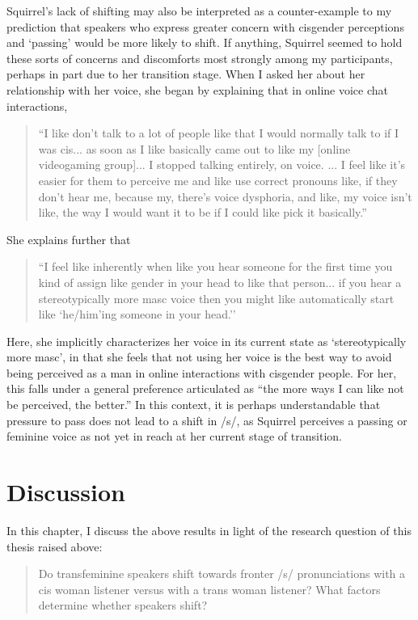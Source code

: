 \documentclass[12pt,twoside]{reedthesis}
\begin{document}
Squirrel's lack of shifting may also be interpreted as a counter-example to my prediction that speakers who express greater concern with cisgender perceptions and `passing' would be more likely to shift. If anything, Squirrel seemed to hold these sorts of concerns and discomforts most strongly among my participants, perhaps in part due to her transition stage. When I asked her about her relationship with her voice, she began by explaining that in online voice chat interactions,
\begin{quote}
``I like don't talk to a lot of people like that I would normally talk to if I was cis... as soon as I like basically came out to like my [online videogaming group]... I stopped talking entirely, on voice. ... I feel like it's easier for them to perceive me and like use correct pronouns like, if they don't hear me, because my, there's voice dysphoria, and like, my voice isn't like, the way I would want it to be if I could like pick it basically.''
\end{quote}
She explains further that
\begin{quote}
``I feel like inherently when like you hear someone for the first time you kind of assign like gender in your head to like that person... if you hear a stereotypically more masc voice then you might like automatically start like `he/him'ing someone in your head.''
\end{quote}
Here, she implicitly characterizes her voice in its current state as `stereotypically more masc', in that she feels that not using her voice is the best way to avoid being perceived as a man in online interactions with cisgender people. For her, this falls under a general preference articulated as ``the more ways I can like not be perceived, the better.'' In this context, it is perhaps understandable that pressure to pass does not lead to a shift in /s/, as Squirrel perceives a passing or feminine voice as not yet in reach at her current stage of transition.

\chapter{Discussion}

In this chapter, I discuss the above results in light of the research question of this thesis raised above:

\begin{quote}
Do transfeminine speakers shift towards fronter /s/ pronunciations with a cis woman listener versus with a trans woman listener? What factors determine whether speakers shift?
\end{quote}
\end{document}
